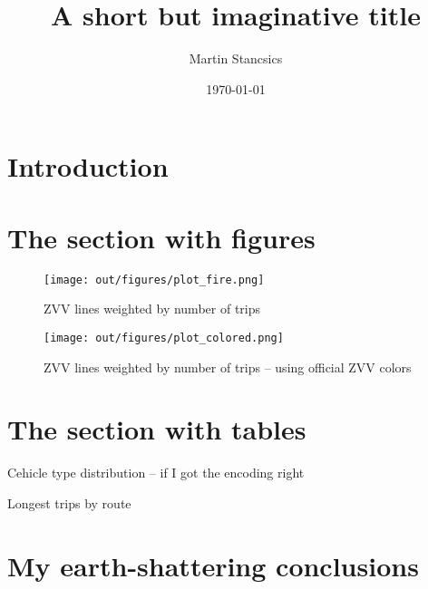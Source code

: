 \documentclass[a4paper]{article}
\author{Martin Stancsics}
\title{A short but imaginative title}
\date{\today}
\begin{document}
\maketitle

\section{Introduction}
\lipsum[1-3]

\section{The section with figures}
\lipsum[4]
\begin{figure}
    \centering
    \texttt{[image: out/figures/plot\_fire.png]}
    \caption{ZVV lines weighted by number of trips}
\end{figure}
\lipsum[5]
\begin{figure}
    \centering
    \texttt{[image: out/figures/plot\_colored.png]}
    \caption{ZVV lines weighted by number of trips -- using official ZVV colors}
\end{figure}

\section{The section with tables}
\lipsum[6]
\begin{table}
    \centering
    \caption{Cehicle type distribution -- if I got the encoding right}
    
\end{table}
\lipsum[7]
\begin{table}
    \centering
    \caption{Longest trips by route}
    
\end{table}

\section{My earth-shattering conclusions}
\lipsum[8-9]
\end{document}
